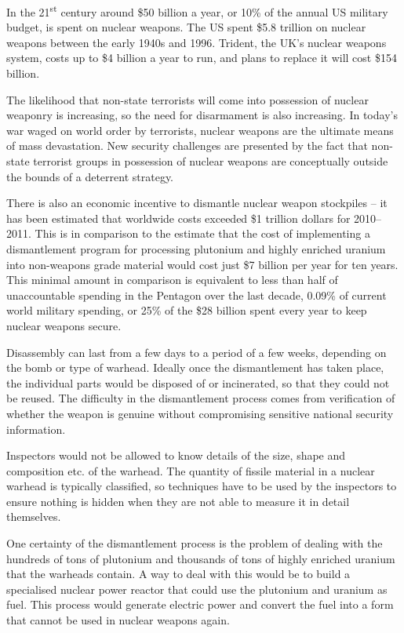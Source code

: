 \documentclass[twoside,titlepage,11pt,twocolumn,a4paper]{article}
\begin{document}
In the 21\textsuperscript{st} century around \$50 billion a year, or
10\% of the annual US military budget, is spent on nuclear
weapons. \citep{USspending} The US spent \$5.8 trillion on nuclear
weapons between the early 1940s and 1996. Trident, the UK's nuclear
weapons system, costs up to \$4 billion a year to run, and plans to
replace it will cost \$154 billion.

The likelihood that non-state terrorists will come into possession of
nuclear weaponry is increasing, so the need for disarmament is also
increasing. In today's war waged on world order by terrorists, nuclear
weapons are the ultimate means of mass devastation. New security
challenges are presented by the fact that non-state terrorist groups
in possession of nuclear weapons are conceptually outside the bounds
of a deterrent strategy.

There is also an economic incentive to dismantle nuclear weapon
stockpiles -- it has been estimated that worldwide costs exceeded \$1
trillion dollars for 2010--2011. \citep{worldSpending} This is in
comparison to the estimate that the cost of implementing a
dismantlement program for processing plutonium and highly enriched
uranium into non-weapons grade material would cost just \$7 billion
per year for ten years. \citep{worldSafe} This minimal amount in
comparison is equivalent to less than half of unaccountable spending
in the Pentagon over the last decade, 0.09\% of current world military
spending, or 25\% of the \$28 billion spent every year to keep nuclear
weapons secure.

Disassembly can last from a few days to a period of a few weeks,
depending on the bomb or type of warhead. \citep{kopte1996} Ideally
once the dismantlement has taken place, the individual parts would be
disposed of or incinerated, so that they could not be reused. The
difficulty in the dismantlement process comes from verification of
whether the weapon is genuine without compromising sensitive national
security information.

Inspectors would not be allowed to know details of the size, shape and
composition etc. of the warhead. The quantity of fissile material in a
nuclear warhead is typically classified, so techniques have to be used
by the inspectors to ensure nothing is hidden when they are not able
to measure it in detail themselves.

One certainty of the dismantlement process is the problem of dealing
with the hundreds of tons of plutonium and thousands of tons of highly
enriched uranium that the warheads contain. A way to deal with this
would be to build a specialised nuclear power reactor that could use
the plutonium and uranium as fuel. This process would generate
electric power and convert the fuel into a form that cannot be used in
nuclear weapons again. \citep{moxFuel, feiveson2011, nature2009}
\end{document}
